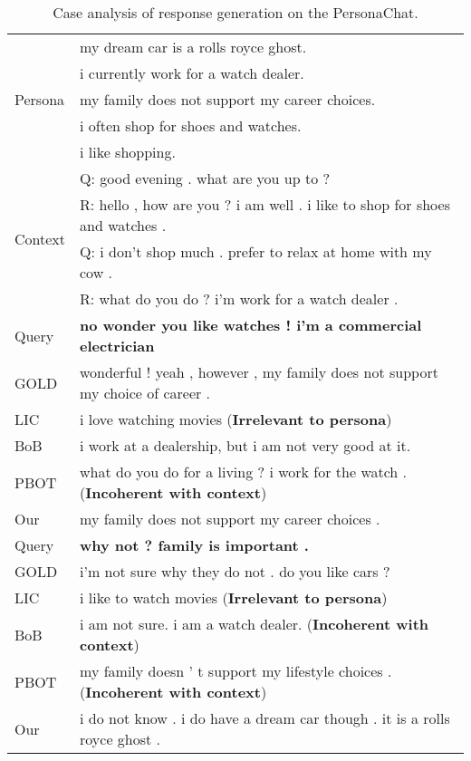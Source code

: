 \documentclass[letterpaper]{article} \usepackage{aaai23}  \usepackage{times}  \usepackage{helvet}  \usepackage{courier}  \usepackage[hyphens]{url}  \usepackage{graphicx} \urlstyle{rm} \def\UrlFont{\rm}  \usepackage{natbib}  \usepackage{caption} \frenchspacing  \setlength{\pdfpagewidth}{8.5in}  \setlength{\pdfpageheight}{11in}  \usepackage{algorithm}
\begin{document}
\begin{table*}[ht]
  \centering
    \begin{tabular}{ll}
    \toprule
    \multirow{5}{*}{Persona} & my dream car is a rolls royce ghost. \\
    ~ & i currently work for a watch dealer.\\
    ~ & my family does not support my career choices. \\
    ~ & i often shop for shoes and watches. \\
    ~ & i like shopping. \\
    \midrule
    \multirow{4}{*}{Context} & Q: good evening . what are you up to ? \\
    ~ & R: hello , how are you ? i am well . i like to shop for shoes and watches . \\
    ~ & Q: i don't shop much . prefer to relax at home with my cow . \\
    ~ & R: what do you do ? i'm work for a watch dealer . \\
   \bottomrule
    \toprule
    Query & \textbf{no wonder you like watches ! i'm a commercial electrician} \\
\midrule   GOLD  & wonderful ! yeah , however , my family does not support my choice of career .\\
\midrule   LIC   & i love watching movies (\textbf{Irrelevant to persona})\\
\midrule    BoB   &  i work at a dealership, but i am not very good at it.\\
\midrule   PBOT & what do you do for a living ? i work for the watch . (\textbf{Incoherent with context})\\
\midrule    Our   & my family does not support my career choices . \\
\bottomrule
\toprule    Query & \textbf{why not ? family is important .} \\
\midrule   GOLD  & i'm not sure why they do not . do you like cars ? \\
\midrule  LIC   & i like to watch movies (\textbf{Irrelevant to persona})\\
\midrule   BoB   &  i am not sure. i am a watch dealer. (\textbf{Incoherent with context})\\
\midrule    PBOT & my family doesn ' t support my lifestyle choices . (\textbf{Incoherent with context})\\
\midrule    Our   & i do not know . i do have a dream car though . it is a rolls royce ghost .\\
\bottomrule    \end{tabular}\caption{Case analysis of response generation on the PersonaChat.}
\label{table9}\end{table*}
\end{document}
